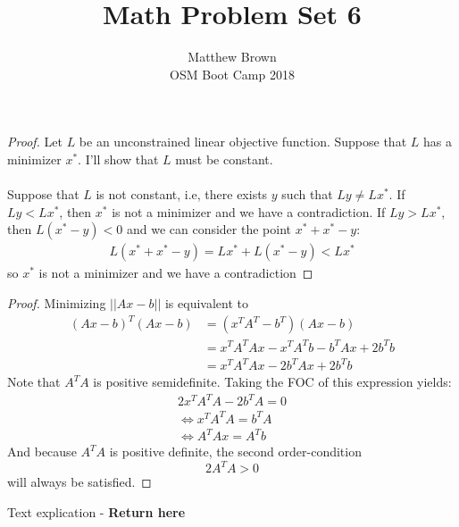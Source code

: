\documentclass[12pt]{article}
\newenvironment{problem}[2][Problem]{\begin{trivlist}
\item[\hskip \labelsep {\bfseries #1}\hskip \labelsep {\bfseries #2.}]}{\end{trivlist}}
\theoremstyle{definition}
\theoremstyle{definition}
\theoremstyle{definition}
\theoremstyle{definition}
\begin{document}
\title{Math Problem Set 6}
\author{Matthew Brown\\ 
OSM Boot Camp 2018} %
 
\maketitle
 
\begin{problem}{9.1}
\begin{proof}
Let $L$ be an unconstrained linear objective function. Suppose that $L$ has a minimizer $x^*$. I'll show that $L$ must be constant. \\ 
\\
Suppose that $L$ is not constant, i.e, there exists $y$ such that $Ly \neq Lx^*$. If $Ly < Lx^*$, then $x^*$ is not a minimizer and we have a contradiction. If $Ly > Lx^*$, then $L(x^* - y) < 0$ and we can consider the point $x^* + x^* - y$: 
\begin{align*}
L(x^* + x^* -y) = Lx^* + L(x^* - y) < Lx^*
\end{align*} 
so $x^*$ is not a minimizer and we have a contradiction
\end{proof}
\end{problem}

\begin{problem}{9.2}
\begin{proof}
Minimizing $||Ax-b||$ is equivalent to \begin{align*}
(Ax-b)^T(Ax-b) &= (x^TA^T - b^T)(Ax-b) \\ 
&= x^TA^TAx - x^TA^Tb -b^TAx +2b^Tb \\
&= x^TA^TAx -2b^TAx +2b^Tb
\end{align*}
Note that $A^TA$ is positive semidefinite. Taking the FOC of this expression yields:
\begin{align*}
2x^TA^TA - 2b^TA = 0 \\
\iff x^TA^TA = b^TA \\
\iff A^TAx = A^Tb
\end{align*}
And because $A^TA$ is positive definite, the second order-condition 
$$
2A^TA > 0
$$
will always be satisfied.
\end{proof}
\end{problem}

\begin{problem}{9.3}
Text explication - \textbf{Return here}
\end{problem}
\end{document}
